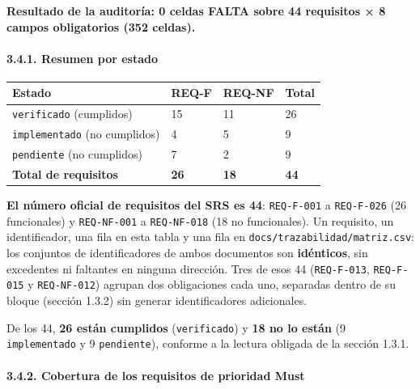 \documentclass[
  spanish,
]{article}
\newcounter{none} %
\begin{document}
\textbf{Resultado de la auditoría: 0 celdas FALTA sobre 44 requisitos ×
8 campos obligatorios (352 celdas).}

\paragraph{3.4.1. Resumen por estado}\label{resumen-por-estado}

{\def\LTcaptype{none} %
\begin{longtable}[]{@{}llll@{}}
\toprule\noalign{}
Estado & REQ-F & REQ-NF & Total \\
\midrule\noalign{}
\endhead
\bottomrule\noalign{}
\endlastfoot
\texttt{verificado} (cumplidos) & 15 & 11 & 26 \\
\texttt{implementado} (no cumplidos) & 4 & 5 & 9 \\
\texttt{pendiente} (no cumplidos) & 7 & 2 & 9 \\
\textbf{Total de requisitos} & \textbf{26} & \textbf{18} &
\textbf{44} \\
\end{longtable}
}

\textbf{El número oficial de requisitos del SRS es 44}:
\texttt{REQ-\allowbreak{}F-\allowbreak{}001} a \texttt{REQ-\allowbreak{}F-\allowbreak{}026} (26 funcionales) y
\texttt{REQ-\allowbreak{}NF-\allowbreak{}001} a \texttt{REQ-\allowbreak{}NF-\allowbreak{}018} (18 no funcionales). Un
requisito, un identificador, una fila en esta tabla y una fila en
\texttt{docs/\allowbreak{}trazabilidad/\allowbreak{}matriz.\allowbreak{}csv}: los conjuntos de identificadores
de ambos documentos son \textbf{idénticos}, sin excedentes ni faltantes
en ninguna dirección. Tres de esos 44 (\texttt{REQ-\allowbreak{}F-\allowbreak{}013},
\texttt{REQ-\allowbreak{}F-\allowbreak{}015} y \texttt{REQ-\allowbreak{}NF-\allowbreak{}012}) agrupan dos obligaciones cada
uno, separadas dentro de su bloque (sección 1.3.2) sin generar
identificadores adicionales.

De los 44, \textbf{26 están cumplidos} (\texttt{verificado}) y
\textbf{18 no lo están} (9 \texttt{implementado} y 9
\texttt{pendiente}), conforme a la lectura obligada de la sección 1.3.1.

\paragraph{3.4.2. Cobertura de los requisitos de prioridad
Must}\label{cobertura-de-los-requisitos-de-prioridad-must}
\end{document}
